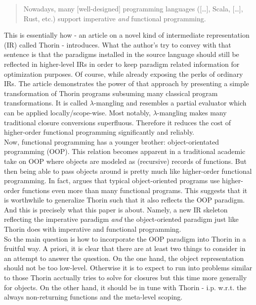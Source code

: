 \begin{quotation}
  Nowadays, many [well-designed] programming languages ([\ldots], Scala, [\ldots], Rust, etc.) support imperative \textit{and} functional programming.
\end{quotation}
This is essentially how \cite{thorin} - an article on a novel kind of intermediate representation (IR) called Thorin - introduces.
What the author's try to convey with that sentence is that the paradigms installed in the source language should still be reflected in higher-level IRs in order to keep paradigm related information for optimization purposes.
Of course, while already exposing the perks of ordinary IRs.
The article demonstrates the power of that approach by presenting a simple transformation of Thorin programs subsuming {\glqq}many classical program transformations{\grqq}.
It is called $\lambda$-mangling and resembles a partial evaluator which can be applied locally/scope-wise.
Most notably, $\lambda$-mangling makes many traditional closure conversions superfluous. Therefore it reduces the cost of higher-order functional programming significantly and reliably.
\\
Now, functional programming has a younger brother: object-orientated programming (OOP).
This relation becomes apparent in a traditional academic take on OOP where objects are modeled as (recursive) records of functions.
But then being able to pass objects around is pretty much like higher-order functional programming.
In fact, \cite{cook} argues that typical object-oriented programs use higher-order functions even more than many functional programs.
This suggests that it is worthwhile to generalize Thorin such that it also reflects the OOP paradigm.
And this is precisely what this paper is about.
Namely, a new IR skeleton reflecting the imperative paradigm \textit{and} the object-oriented paradigm just like Thorin does with imperative and functional programming.
\\
So the main question is how to incorporate the OOP paradigm into Thorin in a fruitful way.
A priori, it is clear that there are at least two things to consider in an attempt to answer the question.
On the one hand, the object representation should not be too low-level.
Otherwise it is to expect to run into problems similar to those Thorin acctually tries to solve for closures but this time more generally for objects.
On the other hand, it should be in tune with Thorin - i.p. w.r.t. the always non-returning functions and the meta-level scoping.
